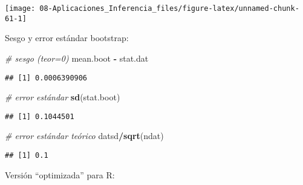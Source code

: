 \documentclass[
]{book}
\newenvironment{Shaded}{\begin{snugshade}}{\end{snugshade}}
\newcommand{\CommentTok}[1]{\textcolor[rgb]{0.56,0.35,0.01}{\textit{#1}}}
\newcommand{\KeywordTok}[1]{\textcolor[rgb]{0.13,0.29,0.53}{\textbf{#1}}}
\newcommand{\NormalTok}[1]{#1}
\newcommand{\OperatorTok}[1]{\textcolor[rgb]{0.81,0.36,0.00}{\textbf{#1}}}
\newcommand{\StringTok}[1]{\textcolor[rgb]{0.31,0.60,0.02}{#1}}
\theoremstyle{break}
\theoremstyle{definition}
\theoremstyle{definition}
\theoremstyle{definition}
\theoremstyle{remark}
\begin{document}
\begin{center}\texttt{[image: 08-Aplicaciones\_Inferencia\_files/figure-latex/unnamed-chunk-61-1]} \end{center}

Sesgo y error estándar bootstrap:

\begin{Shaded}
\begin{Highlighting}[]
\CommentTok{# sesgo (teor=0)}
\NormalTok{mean.boot }\OperatorTok{-}\StringTok{ }\NormalTok{stat.dat }
\end{Highlighting}
\end{Shaded}

\begin{verbatim}
## [1] 0.0006390906
\end{verbatim}

\begin{Shaded}
\begin{Highlighting}[]
\CommentTok{# error estándar}
\KeywordTok{sd}\NormalTok{(stat.boot) }
\end{Highlighting}
\end{Shaded}

\begin{verbatim}
## [1] 0.1044501
\end{verbatim}

\begin{Shaded}
\begin{Highlighting}[]
\CommentTok{# error estándar teórico}
\NormalTok{datsd}\OperatorTok{/}\KeywordTok{sqrt}\NormalTok{(ndat) }
\end{Highlighting}
\end{Shaded}

\begin{verbatim}
## [1] 0.1
\end{verbatim}

Versión ``optimizada'' para R:
\end{document}
